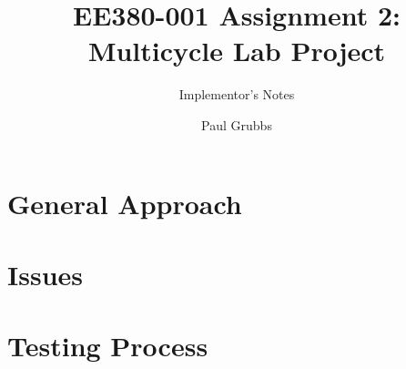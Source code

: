 \documentclass[acmtog]{acmart}
\begin{document}

\title{EE380-001 Assignment 2: Multicycle Lab Project}
\subtitle{Implementor's Notes}

\author{Paul Grubbs}
\author{}
\author{}

\begin{abstract}
\end{abstract}

\maketitle

\section{General Approach}
\section{Issues}

\section{Testing Process}
\end{document}
